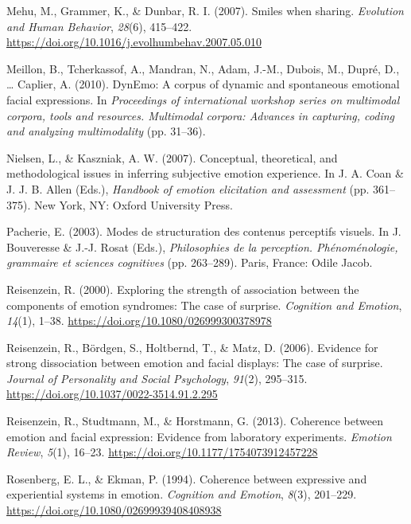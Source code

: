 \documentclass[
  english,
  doc]{apa7}
\newlength{\cslhangindent}
\newenvironment{cslreferences}%
  {\setlength{\parindent}{0pt}%
  \everypar{\setlength{\hangindent}{\cslhangindent}}\ignorespaces}%
  {\par}
\begin{document}
\begin{cslreferences}
\leavevmode\hypertarget{ref-mehu2007smiles}{}%
Mehu, M., Grammer, K., \& Dunbar, R. I. (2007). Smiles when sharing. \emph{Evolution and Human Behavior}, \emph{28}(6), 415--422. \url{https://doi.org/10.1016/j.evolhumbehav.2007.05.010}

\leavevmode\hypertarget{ref-meillon2010dynemo}{}%
Meillon, B., Tcherkassof, A., Mandran, N., Adam, J.-M., Dubois, M., Dupré, D., \ldots{} Caplier, A. (2010). DynEmo: A corpus of dynamic and spontaneous emotional facial expressions. In \emph{Proceedings of international workshop series on multimodal corpora, tools and resources. Multimodal corpora: Advances in capturing, coding and analyzing multimodality} (pp. 31--36).

\leavevmode\hypertarget{ref-nielsen2007conceptual}{}%
Nielsen, L., \& Kaszniak, A. W. (2007). Conceptual, theoretical, and methodological issues in inferring subjective emotion experience. In J. A. Coan \& J. J. B. Allen (Eds.), \emph{Handbook of emotion elicitation and assessment} (pp. 361--375). New York, NY: Oxford University Press.

\leavevmode\hypertarget{ref-pacherie2003modes}{}%
Pacherie, E. (2003). Modes de structuration des contenus perceptifs visuels. In J. Bouveresse \& J.-J. Rosat (Eds.), \emph{Philosophies de la perception. Phénoménologie, grammaire et sciences cognitives} (pp. 263--289). Paris, France: Odile Jacob.

\leavevmode\hypertarget{ref-reisenzein2000exploring}{}%
Reisenzein, R. (2000). Exploring the strength of association between the components of emotion syndromes: The case of surprise. \emph{Cognition and Emotion}, \emph{14}(1), 1--38. \url{https://doi.org/10.1080/026999300378978}

\leavevmode\hypertarget{ref-reisenzein2006evidence}{}%
Reisenzein, R., Bördgen, S., Holtbernd, T., \& Matz, D. (2006). Evidence for strong dissociation between emotion and facial displays: The case of surprise. \emph{Journal of Personality and Social Psychology}, \emph{91}(2), 295--315. \url{https://doi.org/10.1037/0022-3514.91.2.295}

\leavevmode\hypertarget{ref-reisenzein2013coherence}{}%
Reisenzein, R., Studtmann, M., \& Horstmann, G. (2013). Coherence between emotion and facial expression: Evidence from laboratory experiments. \emph{Emotion Review}, \emph{5}(1), 16--23. \url{https://doi.org/10.1177/1754073912457228}

\leavevmode\hypertarget{ref-rosenberg1994coherence}{}%
Rosenberg, E. L., \& Ekman, P. (1994). Coherence between expressive and experiential systems in emotion. \emph{Cognition and Emotion}, \emph{8}(3), 201--229. \url{https://doi.org/10.1080/02699939408408938}


\end{cslreferences}
\end{document}
